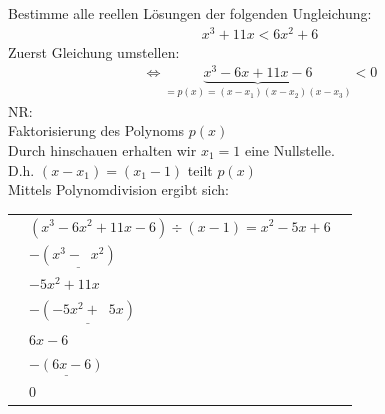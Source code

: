 Bestimme alle reellen Lösungen der folgenden Ungleichung:\\
\begin{align*}
	x^3+11x<6x^2+6
\end{align*}
Zuerst Gleichung umstellen:\
\begin{align*}
	\Leftrightarrow \underbrace {x^3-6x+11x-6}_{=p(x)=(x-x_1)(x-x_2)(x-x_3)}<0
\end{align*}
NR:\\
Faktorisierung des Polynoms $ p(x) $\\
Durch hinschauen erhalten wir $ x_1=1 $ eine Nullstelle.\\
D.h. $ (x-x_1)=(x_1-1) $ teilt $ p(x) $\\
Mittels Polynomdivision ergibt sich:\\
\begin{center}
	\begin{tabular}[t]{lll}%
		&\;\;\;$(x^3-6x^2+11x-6)\div (x-1)=x^2-5x+6 $ \\
		&$-\underline{(x^3-\;\;x^2)} $  \\
		&\hspace{1.1cm}$ -5x^2+11x $\\
		&\hspace{0.6cm}$-\underline{(-5x^2+\;\;5x) }$\\
		&\hspace{2.8cm}$6x-6 $\\
		&\hspace{2.43cm}$\underline{-(6x-6)} $\\
		&\hspace{3.8cm}$0$\\
	\end{tabular} \\
\end{center}
\newpage
\noindent

